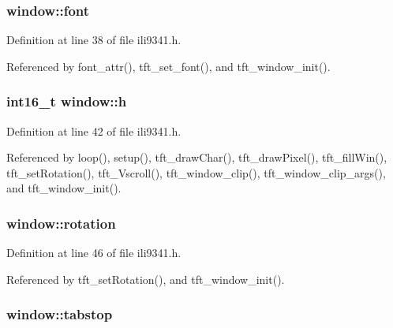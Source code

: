 \hypertarget{structwindow_acee24e56db43557a46cbb5ca3fe35021}{
\subsubsection[{font}]{ window\-::font}}\label{structwindow_acee24e56db43557a46cbb5ca3fe35021}


Definition at line 38 of file ili9341.\-h.



Referenced by font\-\_\-attr(), tft\-\_\-set\-\_\-font(), and tft\-\_\-window\-\_\-init().

\hypertarget{structwindow_a822391abd5d09e6ce7152f68cff3ef2b}{
\subsubsection[{h}]{\setlength{\rightskip}{0pt plus 5cm}int16\-\_\-t window\-::h}}\label{structwindow_a822391abd5d09e6ce7152f68cff3ef2b}


Definition at line 42 of file ili9341.\-h.



Referenced by loop(), setup(), tft\-\_\-draw\-Char(), tft\-\_\-draw\-Pixel(), tft\-\_\-fill\-Win(), tft\-\_\-set\-Rotation(), tft\-\_\-\-Vscroll(), tft\-\_\-window\-\_\-clip(), tft\-\_\-window\-\_\-clip\-\_\-args(), and tft\-\_\-window\-\_\-init().

\hypertarget{structwindow_afbd48ebcb41e68d0f458dac593578aa8}{
\subsubsection[{rotation}]{ window\-::rotation}}\label{structwindow_afbd48ebcb41e68d0f458dac593578aa8}


Definition at line 46 of file ili9341.\-h.



Referenced by tft\-\_\-set\-Rotation(), and tft\-\_\-window\-\_\-init().

\hypertarget{structwindow_a88d2836d45dd428d8fadfd703f0f965f}{
\subsubsection[{tabstop}]{ window\-::tabstop}}\label{structwindow_a88d2836d45dd428d8fadfd703f0f965f}


